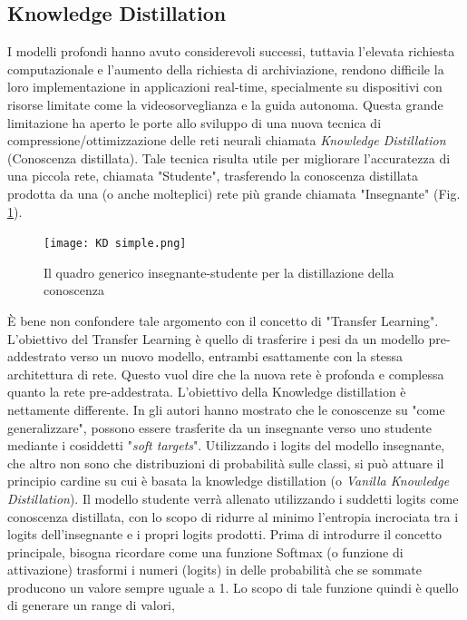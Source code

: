 \subsection{Knowledge Distillation}\label{KD_distill}
I modelli profondi hanno avuto considerevoli successi, tuttavia l'elevata richiesta 
computazionale e l'aumento della richiesta di archiviazione, rendono 
difficile la loro implementazione in applicazioni real-time, specialmente su 
dispositivi con risorse limitate come la videosorveglianza e la guida autonoma. 
Questa grande limitazione ha aperto le porte allo sviluppo di una 
nuova tecnica di compressione/ottimizzazione delle reti neurali chiamata 
\emph{Knowledge Distillation} (Conoscenza distillata). Tale tecnica risulta utile 
per migliorare l'accuratezza di una piccola rete, chiamata "Studente", trasferendo 
la conoscenza distillata prodotta da una (o anche molteplici) rete 
più grande chiamata "Insegnante" (Fig. \ref{KD_simple}).
\begin{figure}
    \centering
    \texttt{[image: KD simple.png]}
    \centering
    \caption{Il quadro generico insegnante-studente per la distillazione della conoscenza}
    \label{KD_simple}
\end{figure}
È bene non confondere tale 
argomento con il concetto di "Transfer Learning". L'obiettivo del Transfer 
Learning è quello di trasferire i pesi da un modello pre-addestrato verso 
un nuovo modello, entrambi esattamente con la stessa architettura di rete. 
Questo vuol dire che la nuova rete è profonda e complessa quanto la rete pre-addestrata.
L'obiettivo della Knowledge distillation è nettamente differente.
In \cite{hinton2015distilling} gli autori hanno mostrato che le conoscenze su "come generalizzare", 
possono essere trasferite da un insegnante verso uno studente mediante i 
cosiddetti "\emph{soft targets}". Utilizzando i logits del modello insegnante, che 
altro non sono che distribuzioni di probabilità sulle classi, si può attuare 
il principio cardine su cui è basata la knowledge distillation (o \emph{Vanilla 
Knowledge Distillation}). Il modello studente verrà allenato utilizzando i 
suddetti logits come conoscenza distillata, con lo scopo di ridurre al minimo 
l'entropia incrociata tra i logits dell'insegnante e i propri logits prodotti. 
Prima di introdurre il concetto principale, bisogna ricordare come una 
funzione Softmax (o funzione di attivazione) trasformi i numeri (logits) in 
delle probabilità che se sommate producono un valore sempre uguale a 1.  
Lo scopo di tale funzione quindi è quello di generare un range di valori, 
